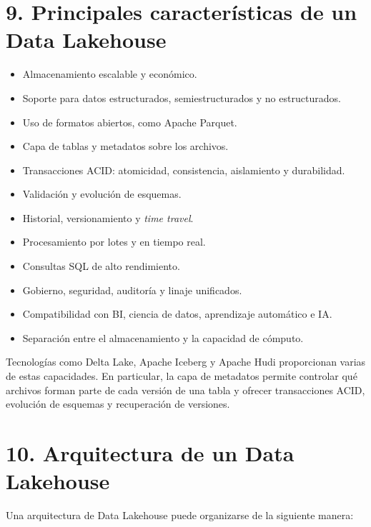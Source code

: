 \section*{9. Principales características de un Data Lakehouse}

\begin{itemize}
    \item Almacenamiento escalable y económico.
    \item Soporte para datos estructurados, semiestructurados y no estructurados.
    \item Uso de formatos abiertos, como Apache Parquet.
    \item Capa de tablas y metadatos sobre los archivos.
    \item Transacciones ACID: atomicidad, consistencia, aislamiento y durabilidad.
    \item Validación y evolución de esquemas.
    \item Historial, versionamiento y \textit{time travel}.
    \item Procesamiento por lotes y en tiempo real.
    \item Consultas SQL de alto rendimiento.
    \item Gobierno, seguridad, auditoría y linaje unificados.
    \item Compatibilidad con BI, ciencia de datos, aprendizaje automático e IA.
    \item Separación entre el almacenamiento y la capacidad de cómputo.
\end{itemize}

Tecnologías como Delta Lake, Apache Iceberg y Apache Hudi proporcionan varias
de estas capacidades. En particular, la capa de metadatos permite controlar qué
archivos forman parte de cada versión de una tabla y ofrecer transacciones ACID,
evolución de esquemas y recuperación de versiones.

\section*{10. Arquitectura de un Data Lakehouse}

Una arquitectura de Data Lakehouse puede organizarse de la siguiente manera:

